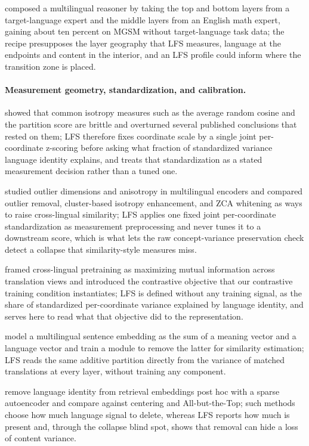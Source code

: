 \documentclass[11pt,a4paper]{article}
\begin{document}
\citet{bandarkar2025swapping} composed a multilingual reasoner by taking the top and bottom layers from a target-language expert and the middle layers from an English math expert, gaining about ten percent on MGSM without target-language task data; the recipe presupposes the layer geography that LFS measures, language at the endpoints and content in the interior, and an LFS profile could inform where the transition zone is placed.

\paragraph{Measurement geometry, standardization, and calibration.}
\citet{rudman2022isoscore} showed that common isotropy measures such as the average random cosine and the partition score are brittle and overturned several published conclusions that rested on them; LFS therefore fixes coordinate scale by a single joint per-coordinate z-scoring before asking what fraction of standardized variance language identity explains, and treats that standardization as a stated measurement decision rather than a tuned one.

\citet{hammerl2023anisotropy} studied outlier dimensions and anisotropy in multilingual encoders and compared outlier removal, cluster-based isotropy enhancement, and ZCA whitening as ways to raise cross-lingual similarity; LFS applies one fixed joint per-coordinate standardization as measurement preprocessing and never tunes it to a downstream score, which is what lets the raw concept-variance preservation check detect a collapse that similarity-style measures miss.

\citet{chi2021infoxlm} framed cross-lingual pretraining as maximizing mutual information across translation views and introduced the contrastive objective that our contrastive training condition instantiates; LFS is defined without any training signal, as the share of standardized per-coordinate variance explained by language identity, and serves here to read what that objective did to the representation.

\citet{tiyajamorn2021representation} model a multilingual sentence embedding as the sum of a meaning vector and a language vector and train a module to remove the latter for similarity estimation; LFS reads the same additive partition directly from the variance of matched translations at every layer, without training any component.

\citet{kim2026langsae} remove language identity from retrieval embeddings post hoc with a sparse autoencoder and compare against centering and All-but-the-Top; such methods choose how much language signal to delete, whereas LFS reports how much is present and, through the collapse blind spot, shows that removal can hide a loss of content variance.
\end{document}
